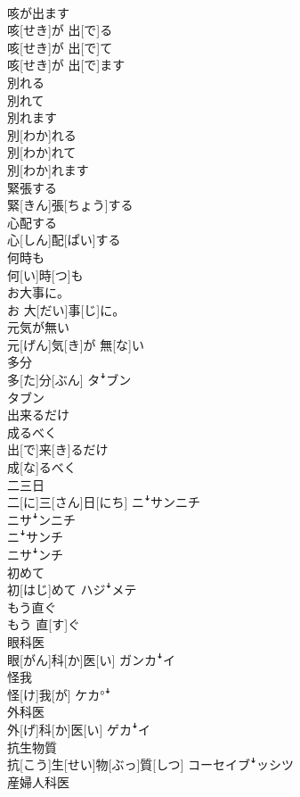 \documentclass[8pt]{extreport}
\begin{document}
\begin{CJK}{UTF8}{min}
\\	咳が出ます	
\\	咳[せき]が 出[で]る 
\\	咳[せき]が 出[で]て 
\\	咳[せき]が 出[で]ます	
\\	別れる 
\\	別れて 
\\	別れます	
\\	別[わか]れる 
\\	別[わか]れて 
\\	別[わか]れます	
\\	緊張する	
\\	緊[きん]張[ちょう]する	
\\	心配する	
\\	心[しん]配[ぱい]する	
\\	何時も	
\\	何[い]時[つ]も	
\\	お大事に。	
\\	お 大[だい]事[じ]に。	
\\	元気が無い	
\\	元[げん]気[き]が 無[な]い	
\\	多分	
\\	多[た]分[ぶん]	タꜜブン 
\\	タブン
\\	出来るだけ 
\\	成るべく	
\\	出[で]来[き]るだけ 
\\	成[な]るべく	
\\	二三日	
\\	二[に]三[さん]日[にち]	ニꜜサンニチ 
\\	ニサꜜンニチ 
\\	ニꜜサンチ 
\\	ニサꜜンチ
\\	初めて	
\\	初[はじ]めて	ハジꜜメテ
\\	もう直ぐ	
\\	もう 直[す]ぐ	
\\	眼科医	
\\	眼[がん]科[か]医[い]	ガンカꜜイ
\\	怪我	
\\	怪[け]我[が]	ケカ°ꜜ
\\	外科医	
\\	外[げ]科[か]医[い]	ゲカꜜイ
\\	抗生物質	
\\	抗[こう]生[せい]物[ぶっ]質[しつ]	コーセイブꜜッシツ
\\	産婦人科医	

\end{CJK}
\end{document}
